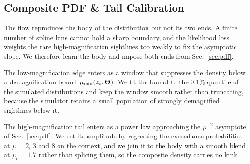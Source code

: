 \documentclass[aps,prd,10pt,nofootinbib,twocolumn,superscriptaddress,floatfix,notitlepage]{revtex4-1}
\newcommand{\vect}[1]{\boldsymbol{#1}}
\begin{document}
%
\subsection{Composite PDF \& Tail Calibration}

The flow reproduces the body of the distribution but not its two ends. A
finite number of spline bins cannot hold a sharp boundary, and the likelihood
loss weights the rare high-magnification sightlines too weakly to fix the
asymptotic slope. We therefore learn the body and impose both ends from
Sec.~\ref{sec:pdf}.

The low-magnification edge enters as a window that suppresses the density below
a demagnification bound $\mu_{\rm min}(z_s,\vect\Theta)$. We fit the bound to
the $0.1\%$ quantile of the simulated distributions and keep the window smooth
rather than truncating, because the simulator retains a small population of
strongly demagnified sightlines below it.

The high-magnification tail enters as a power law approaching the $\mu^{-2}$
asymptote of Sec.~\ref{sec:pdf}. We set its amplitude by regressing the
exceedance probabilities at $\mu = 2$, $3$ and $8$ on the context, and we join
it to the body with a smooth blend at $\mu_c = 1.7$ rather than splicing them,
so the composite density carries no kink.
\end{document}

